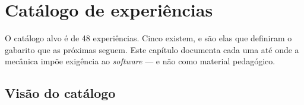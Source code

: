 \chapter{Catálogo de experiências}
\label{cap:experiencias}

O catálogo alvo é de 48 experiências. Cinco existem, e são elas que definiram o
gabarito que as próximas seguem. Este capítulo documenta cada uma até onde a
mecânica impõe exigência ao \emph{software} --- e não como material pedagógico.

\section{Visão do catálogo}

